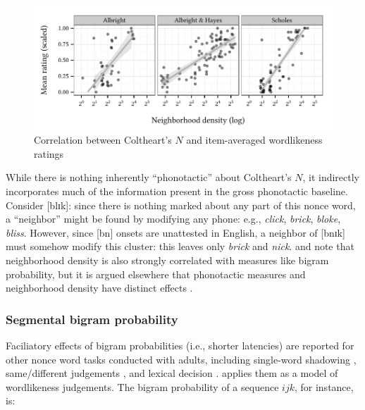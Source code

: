
\begin{figure}[t]
\centering
\includegraphics{neighborhood.pdf}
\caption{Correlation between Coltheart's $N$ and item-averaged wordlikeness ratings}
\label{neighborhood}
\end{figure}

While there is nothing inherently ``phonotactic'' about Coltheart's $N$, it indirectly incorporates much of the information present in the gross phonotactic baseline. 
Consider [blɪk]: since there is nothing marked about any part of this nonce word, a ``neighbor'' might be found by modifying any phone: e.g., \emph{click}, \emph{brick}, \emph{bloke}, \emph{bliss}. 
However, since [bn] onsets are unattested in English, a neighbor of [bnɪk] must somehow modify this cluster: this leaves only \emph{brick} and \emph{nick}. 
\citet{Bailey2001} and \citet{Frauenfelder1993} note that neighborhood density is also strongly correlated with measures like bigram probability, but it is argued elsewhere that phonotactic measures and neighborhood density have distinct effects \citep[e.g.,][]{Berent2003,Pitt1998b,Vitevitch1998,Vitevitch1999a}. 

\subsubsection{Segmental bigram probability}

Faciliatory effects of bigram probabilities (i.e., shorter latencies) are reported for other nonce word tasks conducted with adults, including single-word shadowing \citep{Vitevitch1997,Vitevitch1998}, same/different judgements \citep{Lipinski2005,Luce2001,Vitevitch1999a,Vitevitch2005}, and lexical decision \citep{Pylkkanen2002a}. \citet{Albright2009a} applies them as a model of wordlikeness judgements. The bigram probability of a sequence $ijk$, for instance, is:

